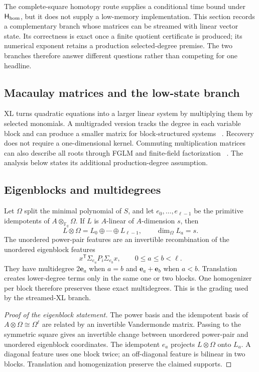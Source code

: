 \documentclass[11pt]{article}
\newcommand{\F}{\mathbb F}
\newcommand{\transpose}{\mathsf T}
\begin{document}
The complete-square homotopy route supplies a conditional time bound under
$\mathsf H_{\rm hom}$, but it does not supply a low-memory implementation.
This section records a complementary
branch whose matrices can be streamed with linear vector state.  Its
correctness is exact once a finite quotient certificate is produced; its
numerical exponent retains a production selected-degree premise.  The two
branches therefore answer different questions rather than competing for one
headline.

\subsection{Macaulay matrices and the low-state branch}
XL turns quadratic equations into a larger linear system by multiplying them
by selected monomials.  A multigraded version tracks the degree in each
variable block and can produce a smaller matrix for block-structured systems
~\cite{Cabarcas2025SNOVA,FurueEtAl2025}.  Recovery does not require a
one-dimensional kernel.  Commuting multiplication matrices can also describe
all roots through FGLM and finite-field factorization
~\cite{FGLM1993,KehreinKreuzer2005}.  The analysis below states its additional
production-degree assumption.

\subsection{Eigenblocks and multidegrees}
Let $\Omega$ split the minimal polynomial of $S$, and let
$e_0,\ldots,e_{\ell-1}$ be the primitive idempotents of
$A\otimes_{\F_q}\Omega$.  If $L$ is $A$-linear of $A$-dimension $s$, then
\[
 L\otimes\Omega=L_0\oplus\cdots\oplus L_{\ell-1},
 \qquad \dim_\Omega L_a=s.
\]
The unordered power-pair features are an invertible recombination of the
unordered eigenblock features
\[
 x^\transpose\Sigma_{e_a}P_i\Sigma_{e_b}x,
 \qquad 0\le a\le b<\ell.
\]
They have multidegree $2\mathbf e_a$ when $a=b$ and
$\mathbf e_a+\mathbf e_b$ when $a<b$.  Translation creates lower-degree terms
only in the same one or two blocks.  One homogenizer per block therefore
preserves these exact multidegrees.  This is the grading used by the
streamed-XL branch.

\begin{proof}[Proof of the eigenblock statement]
The power basis and the idempotent basis of
$A\otimes\Omega\cong\Omega^\ell$ are related by an invertible Vandermonde
matrix.  Passing to the symmetric square gives an invertible change between
unordered power-pair and unordered eigenblock coordinates.  The idempotent
$e_a$ projects $L\otimes\Omega$ onto $L_a$.  A diagonal feature uses one
block twice; an off-diagonal feature is bilinear in two blocks.  Translation
and homogenization preserve the claimed supports.
\end{proof}
\end{document}
